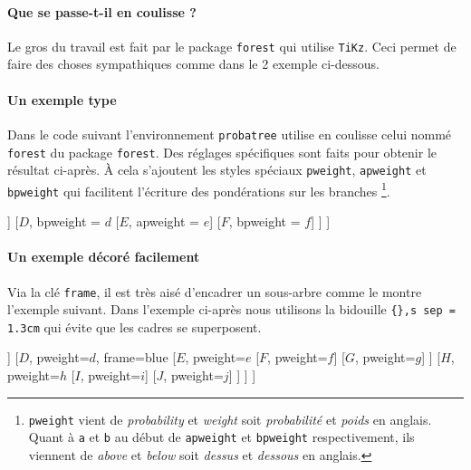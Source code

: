 \documentclass[12pt,a4paper]{article}
\theoremstyle{definition}
\begin{document}
\paragraph{Que se passe-t-il en coulisse ?}

Le gros du travail est fait par le package \verb+forest+ qui utilise \verb+TiKz+. Ceci permet de faire des choses sympathiques comme dans le 2\ieme{} exemple ci-dessous.




\paragraph{Un exemple type}

Dans le code suivant l'environnement \verb+probatree+ utilise en coulisse celui nommé \verb+forest+ du package \verb+forest+. Des réglages spécifiques sont faits pour obtenir le résultat ci-après.
À cela s'ajoutent les styles spéciaux \verb+pweight+, \verb+apweight+ et \verb+bpweight+ qui facilitent l'écriture des pondérations sur les branches
\footnote{
    \texttt{pweight} vient de \emph{\og probability \fg} et \emph{\og weight\fg} soit \emph{\og probabilité \fg} et \emph{\og poids\fg} en anglais.
    Quant à \texttt{a} et \texttt{b} au début de \texttt{apweight} et \texttt{bpweight} respectivement, ils viennent de \emph{\og above \fg} et \emph{\og below\fg} soit \emph{\og dessus \fg} et \emph{\og dessous\fg} en anglais.
}.

\begin{latexex}
\begin{probatree}
[
    [$A$, pweight = $a$
        [$B$, pweight = $b$]
        [$C$, pweight = $c$]
    ]
    [$D$, bpweight = $d$
        [$E$, apweight = $e$]
        [$F$, bpweight = $f$]
    ]
]
\end{probatree}
\end{latexex}




\paragraph{Un exemple décoré facilement}

Via la clé \verb+frame+, il est très aisé d'encadrer un sous-arbre comme le montre l'exemple suivant. Dans l'exemple ci-après nous utilisons la bidouille \verb+{},s sep = 1.3cm+ qui évite que les cadres se superposent.

\begin{latexex}
\begin{probatree}
[{},s sep = 1.3cm
    [$A$, pweight=$a$, frame=red
        [$B$, pweight=$b$]
        [$C$, pweight=$c$]
    ]
    [$D$, pweight=$d$, frame=blue
        [$E$, pweight=$e$
            [$F$, pweight=$f$]
            [$G$, pweight=$g$]
        ]
        [$H$, pweight=$h$
            [$I$, pweight=$i$]
            [$J$, pweight=$j$]
        ]
    ]
]
\end{probatree}
\end{latexex}
\end{document}
